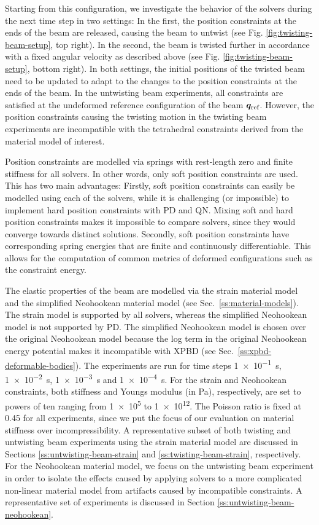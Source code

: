 Starting from this configuration, we investigate the behavior of the 
solvers during the next time step in two settings: In the first, the position constraints at the ends of the beam are released, causing the 
beam to untwist (see Fig. \ref{fig:twisting-beam-setup}, top right). In the second, the beam is twisted further in accordance with a fixed angular
velocity as described above (see Fig. \ref{fig:twisting-beam-setup}, bottom right). In both settings, the initial positions of the twisted beam 
need to be updated to adapt to the changes to the position constraints at the ends of the beam. In the untwisting beam experiments, all constraints are satisfied at the 
undeformed reference configuration of the beam $\bm{q}_\text{ref}$. However, the position constraints causing the twisting motion in the twisting beam experiments are 
incompatible with the tetrahedral constraints derived from the material model of interest. 

Position constraints are modelled via springs with rest-length zero and finite stiffness for all solvers. In other words, only soft position constraints 
are used. This has two main advantages: Firstly, soft position constraints can easily be modelled using each of the solvers, while it is challenging (or impossible) to 
implement hard position constraints with PD and QN. Mixing soft and hard position constraints makes it impossible to compare solvers,
since they would converge towards distinct solutions. Secondly, soft position constraints have corresponding spring energies that are 
finite and continuously differentiable. This allows for the computation of common metrics of deformed configurations such as the constraint 
energy. 

The elastic properties of the beam are modelled via the strain material model and the simplified Neohookean 
material model (see Sec.\ \ref{ss:material-models}). The strain model is supported by all solvers, whereas the simplified Neohookean model is 
not supported by PD. The simplified Neohookean model is chosen over the original Neohookean model because the log term in the original 
Neohookean energy potential makes it incompatible with XPBD (see Sec.\ \ref{ss:xpbd-deformable-bodies}). The experiments are run for time steps 
\SI{1e-1}{\second}, \SI{1e-2}{\second}, \SI{1e-3}{\second} and \SI{1e-4}{\second}. For the strain and Neohookean constraints, both 
stiffness and Youngs modulus (in Pa), respectively, are set to powers of ten ranging from \num{1e5} to \num{1e12}. The Poisson ratio is fixed 
at 0.45 for all experiments, since we put the focus of our evaluation on material stiffness over incompressibility. A representative subset of both 
twisting and untwisting beam experiments using the strain material model are discussed in Sections \ref{ss:untwisting-beam-strain} and 
\ref{ss:twisting-beam-strain}, respectively. For the Neohookean material model, we focus on the untwisting beam experiment in order to isolate the effects caused 
by applying solvers to a more complicated non-linear material model from artifacts caused by incompatible constraints. A representative set of experiments is discussed 
in Section \ref{ss:untwisting-beam-neohookean}.

